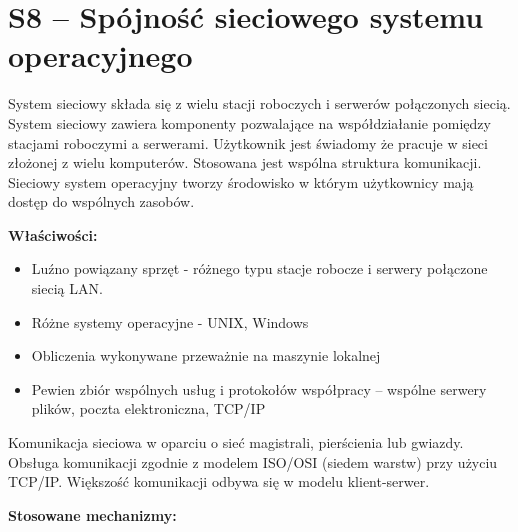 \section{S8 -- Spójność sieciowego systemu operacyjnego}


System sieciowy składa się z wielu stacji roboczych i serwerów połączonych siecią. System sieciowy zawiera komponenty pozwalające na współdziałanie pomiędzy stacjami roboczymi a serwerami. Użytkownik jest świadomy że pracuje w sieci złożonej z wielu komputerów. Stosowana jest wspólna struktura komunikacji. Sieciowy system operacyjny tworzy środowisko w którym użytkownicy mają dostęp do wspólnych zasobów.
 
\textbf{Właściwości:}

\begin{itemize}
	\item Luźno powiązany sprzęt - różnego typu stacje robocze i serwery połączone siecią LAN.
	\item Różne systemy operacyjne - UNIX, Windows
	\item Obliczenia wykonywane przeważnie na maszynie lokalnej
	\item Pewien zbiór wspólnych usług i protokołów współpracy – wspólne serwery plików, poczta elektroniczna, TCP/IP
\end{itemize}
 
Komunikacja sieciowa w oparciu o sieć magistrali, pierścienia lub gwiazdy. Obsługa komunikacji
zgodnie z modelem ISO/OSI (siedem warstw) przy użyciu TCP/IP. Większość komunikacji odbywa
się w modelu klient-serwer. 

\textbf{Stosowane mechanizmy:}

